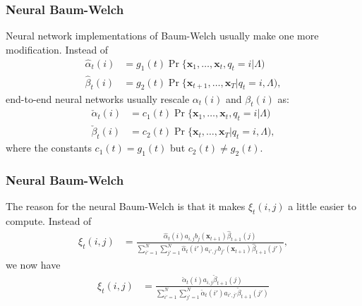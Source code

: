 \documentclass{beamer}
\begin{document}
\begin{frame}
  \frametitle{Neural Baum-Welch}

  Neural network implementations of Baum-Welch usually make one more
  modification.  Instead of
  \begin{align*}
    \hat\alpha_t(i) &= g_1(t)\Pr\{\mathbf{x}_1,\ldots,\mathbf{x}_t,q_t=i|\Lambda)\\
    \hat\beta_t(i) &= g_2(t)\Pr\{\mathbf{x}_{t+1},\ldots,\mathbf{x}_T|q_t=i,\Lambda),
  \end{align*}
  end-to-end neural networks usually rescale $\alpha_t(i)$ and $\beta_t(i)$ as:
  \begin{align*}
    \check\alpha_t(i) &= c_1(t)\Pr\{\mathbf{x}_1,\ldots,\mathbf{x}_t,q_t=i|\Lambda)\\
    \check\beta_t(i) &= c_2(t)\Pr\{\mathbf{x}_{t},\ldots,\mathbf{x}_T|q_t=i,\Lambda),
  \end{align*}
  where the constants $c_1(t)=g_1(t)$ but $c_2(t)\ne g_2(t)$.
\end{frame}

\begin{frame}
  \frametitle{Neural Baum-Welch}

  The reason for the neural Baum-Welch is that it makes $\xi_t(i,j)$
  a little easier to compute.  Instead of
  \begin{align*}
    \xi_t(i,j)
    &=\frac{\hat\alpha_t(i)a_{i,j}b_j(\mathbf{x}_{t+1})\hat\beta_{t+1}(j)}{\sum_{i'=1}^N\sum_{j'=1}^N\hat\alpha_t(i')a_{i',j'}b_{j'}(\mathbf{x}_{t+1})\hat\beta_{t+1}(j')},
  \end{align*}
  we now have
  \begin{align*}
    \xi_t(i,j)
    &=\frac{\check\alpha_t(i)a_{i,j}\check\beta_{t+1}(j)}{\sum_{i'=1}^N\sum_{j'=1}^N\check\alpha_t(i')a_{i',j'}\check\beta_{t+1}(j')}
  \end{align*}
\end{frame}
\end{document}
